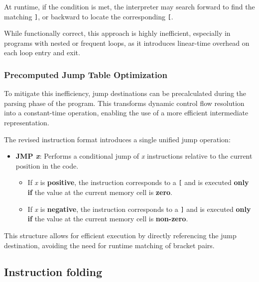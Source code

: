 \par At runtime, if the condition is met, the interpreter may search forward to find the matching \texttt{]}, or backward to locate the corresponding \texttt{[}.

\par While functionally correct, this approach is highly inefficient, especially in programs with nested or frequent loops, as it introduces linear-time overhead on each loop entry and exit.

\subsubsection*{Precomputed Jump Table Optimization}

\par To mitigate this inefficiency, jump destinations can be precalculated during the parsing phase of the program. This transforms dynamic control flow resolution into a constant-time operation, enabling the use of a more efficient intermediate representation.

\par The revised instruction format introduces a single unified jump operation:

\begin{itemize}
    \item \textbf{JMP \textit{x}}: Performs a conditional jump of \textit{x} instructions relative to the current position in the code.
    \begin{itemize}
        \item If \textit{x} is \textbf{positive}, the instruction corresponds to a \texttt{[} and is executed \textbf{only if} the value at the current memory cell is \textbf{zero}.
        \item If \textit{x} is \textbf{negative}, the instruction corresponds to a \texttt{]} and is executed \textbf{only if} the value at the current memory cell is \textbf{non-zero}.
    \end{itemize}
\end{itemize}

\par This structure allows for efficient execution by directly referencing the jump destination, avoiding the need for runtime matching of bracket pairs.

\subsection{Instruction folding}
\label{subsec:ch2sec3sec2}

